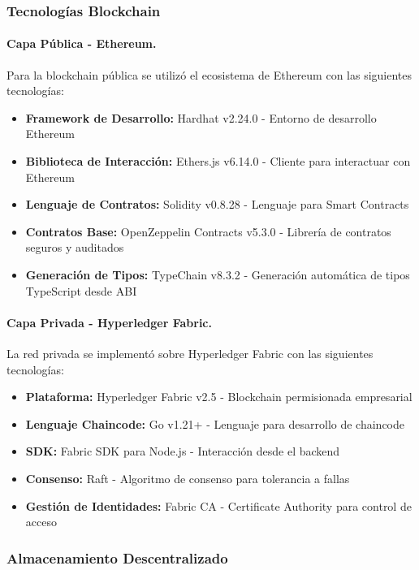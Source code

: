 \subsubsection{Tecnologías Blockchain}

\paragraph{Capa Pública - Ethereum.}
Para la blockchain pública se utilizó el ecosistema de Ethereum con las siguientes tecnologías:

\begin{itemize}
    \item \textbf{Framework de Desarrollo:} Hardhat v2.24.0 - Entorno de desarrollo Ethereum
    \item \textbf{Biblioteca de Interacción:} Ethers.js v6.14.0 - Cliente para interactuar con Ethereum
    \item \textbf{Lenguaje de Contratos:} Solidity v0.8.28 - Lenguaje para Smart Contracts
    \item \textbf{Contratos Base:} OpenZeppelin Contracts v5.3.0 - Librería de contratos seguros y auditados
    \item \textbf{Generación de Tipos:} TypeChain v8.3.2 - Generación automática de tipos TypeScript desde ABI
\end{itemize}

\paragraph{Capa Privada - Hyperledger Fabric.}
La red privada se implementó sobre Hyperledger Fabric con las siguientes tecnologías:

\begin{itemize}
    \item \textbf{Plataforma:} Hyperledger Fabric v2.5 - Blockchain permisionada empresarial
    \item \textbf{Lenguaje Chaincode:} Go v1.21+ - Lenguaje para desarrollo de chaincode
    \item \textbf{SDK:} Fabric SDK para Node.js - Interacción desde el backend
    \item \textbf{Consenso:} Raft - Algoritmo de consenso para tolerancia a fallas
    \item \textbf{Gestión de Identidades:} Fabric CA - Certificate Authority para control de acceso
\end{itemize}

\subsubsection{Almacenamiento Descentralizado}

